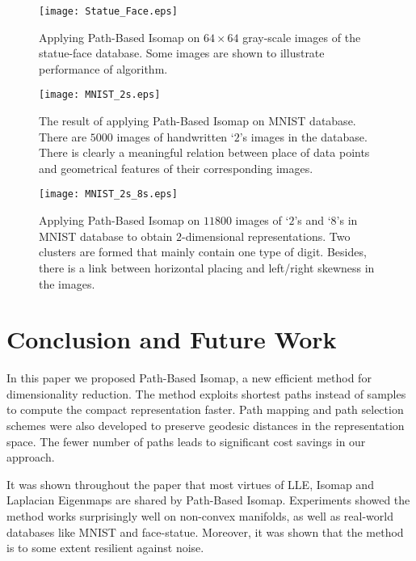 \documentclass[10pt,journal,cspaper,compsoc]{IEEEtran}
\let\MYoriglatexcaption\caption
\renewcommand{\caption}[2][\relax]{\MYoriglatexcaption[#2]{#2}}
\begin{document}
\begin{figure}[t]
\centering
    \texttt{[image: Statue\_Face.eps]}
    \caption{{\small Applying Path-Based Isomap on $64\times 64$ gray-scale images of the statue-face database. Some images are shown to illustrate performance of algorithm.}}
    \label{fig_8_3}
\end{figure}

\begin{figure}[b]
\centering
    \texttt{[image: MNIST\_2s.eps]}
    \caption{{\small The result of applying Path-Based Isomap on MNIST database. There are $5000$ images of handwritten `$2$'s images in the database. There is clearly a meaningful relation between place of data points and geometrical features of their corresponding images.}}
    \label{fig_8_4}
\end{figure}

\begin{figure}[t]
\centering
    \texttt{[image: MNIST\_2s\_8s.eps]}
    \caption{{\small Applying Path-Based Isomap on $11800$ images of `$2$'s and `$8$'s in MNIST database to obtain $2$-dimensional representations. Two clusters are formed that mainly contain one type of digit. Besides, there is a link between horizontal placing and left/right skewness in the images.}}
    \label{fig_8_5}
\end{figure}

\section{Conclusion and Future Work}
In this paper we proposed Path-Based Isomap, a new efficient method for dimensionality reduction. The method exploits shortest paths instead of samples to compute the compact representation faster. Path mapping and path selection schemes were also developed to preserve geodesic distances in the representation space. The fewer number of paths leads to significant cost savings in our approach.

It was shown throughout the paper that most virtues of LLE, Isomap and Laplacian Eigenmaps are shared by Path-Based Isomap. Experiments showed the method works surprisingly well on non-convex manifolds, as well as real-world databases like MNIST and face-statue. Moreover, it was shown that the method is to some extent resilient against noise. 
\end{document}
